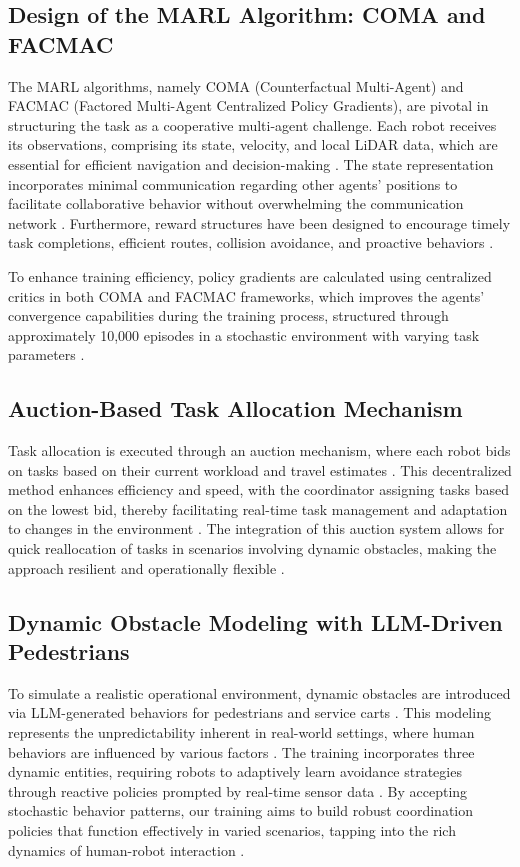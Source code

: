 \documentclass[conference]{IEEEtran}
\begin{document}
\subsection{Design of the MARL Algorithm: COMA and FACMAC}
The MARL algorithms, namely COMA (Counterfactual Multi-Agent) and FACMAC (Factored Multi-Agent Centralized Policy Gradients), are pivotal in structuring the task as a cooperative multi-agent challenge. Each robot receives its observations, comprising its state, velocity, and local LiDAR data, which are essential for efficient navigation and decision-making \citep{zhang2024, park2022}. The state representation incorporates minimal communication regarding other agents’ positions to facilitate collaborative behavior without overwhelming the communication network \citep{choi2023}. Furthermore, reward structures have been designed to encourage timely task completions, efficient routes, collision avoidance, and proactive behaviors \citep{yu2023}.

To enhance training efficiency, policy gradients are calculated using centralized critics in both COMA and FACMAC frameworks, which improves the agents’ convergence capabilities during the training process, structured through approximately 10,000 episodes in a stochastic environment with varying task parameters \citep{salinas2023}.

\subsection{Auction-Based Task Allocation Mechanism}
Task allocation is executed through an auction mechanism, where each robot bids on tasks based on their current workload and travel estimates \citep{galiat2023}. This decentralized method enhances efficiency and speed, with the coordinator assigning tasks based on the lowest bid, thereby facilitating real-time task management and adaptation to changes in the environment \citep{kayy2017}. The integration of this auction system allows for quick reallocation of tasks in scenarios involving dynamic obstacles, making the approach resilient and operationally flexible \citep{gerkey2023}.

\subsection{Dynamic Obstacle Modeling with LLM-Driven Pedestrians}
To simulate a realistic operational environment, dynamic obstacles are introduced via LLM-generated behaviors for pedestrians and service carts \citep{choi2023}. This modeling represents the unpredictability inherent in real-world settings, where human behaviors are influenced by various factors \citep{yang2022}. The training incorporates three dynamic entities, requiring robots to adaptively learn avoidance strategies through reactive policies prompted by real-time sensor data \citep{salinas2023}. By accepting stochastic behavior patterns, our training aims to build robust coordination policies that function effectively in varied scenarios, tapping into the rich dynamics of human-robot interaction \citep{yang2022, rostumi2019}.
\end{document}
